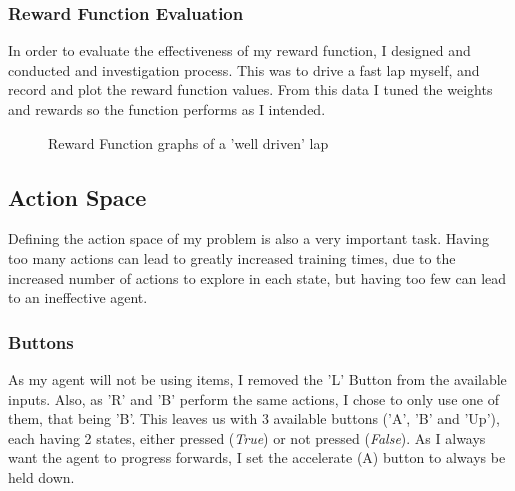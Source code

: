\subsubsection{Reward Function Evaluation}
In order to evaluate the effectiveness of my reward function, I designed and conducted and investigation process. This was to drive a fast lap myself, and record and plot the reward function values. From this data I tuned the weights and rewards so the function performs as I intended.
\begin{figure}[ht]
    \centering
    \hfill
    \caption{Reward Function graphs of a 'well driven' lap}
\end{figure}
\subsection{Action Space}
Defining the action space of my problem is also a very important task. Having too many actions can lead to greatly increased training times, due to the increased number of actions to explore in each state, but having too few can lead to an ineffective agent.
\subsubsection{Buttons}
As my agent will not be using items, I removed the 'L' Button from the available inputs. Also, as 'R' and 'B' perform the same actions, I chose to only use one of them, that being 'B'. This leaves us with 3 available buttons ('A', 'B' and 'Up'), each having 2 states, either pressed (\textit{True}) or not pressed (\textit{False}). As I always want the agent to progress forwards, I set the accelerate (A) button to always be held down. 
